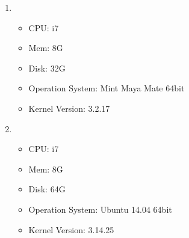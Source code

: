   \begin{enumerate}
	  	\item   
		\begin{itemize}
				\item CPU: i7
				\item Mem: 8G
				\item Disk: 32G
				\item Operation System: Mint Maya Mate 64bit
				\item Kernel Version: 3.2.17
		\end{itemize}
		\item
		\begin{itemize}
			\item CPU: i7
			\item Mem: 8G
			\item Disk: 64G
			\item Operation System: Ubuntu 14.04 64bit
			\item Kernel Version: 3.14.25
		\end{itemize}
		    
  \end{enumerate}

